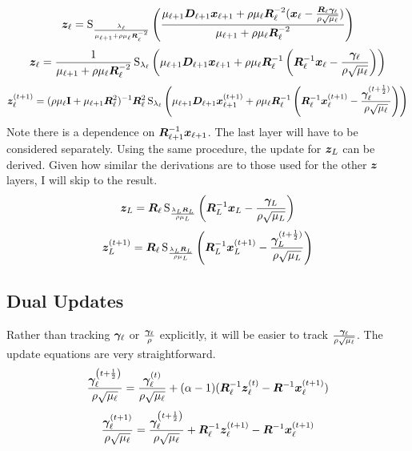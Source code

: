 %
\begin{equation}
\bm{z}_{\ell} = \operatorname{S}_{\frac{\lambda_{\ell}}{\mu_{\ell + 1} + \rho\mu_{\ell}\bm{R}_{\ell}^{-2}}}\left(\frac{\mu_{\ell + 1}\bm{D}_{\ell + 1}\bm{x}_{\ell + 1} + \rho\mu_{\ell}\bm{R}_{\ell}^{-2}(\bm{x}_{\ell} - \frac{\bm{R}_{\ell}\bm{\gamma}_{\ell}}{\rho\sqrt{\mu_{\ell}}})}{\mu_{\ell + 1} + \rho\mu_{\ell}\bm{R}_{\ell}^{-2}}\right)
\end{equation}
%
\begin{equation}
\bm{z}_{\ell} = \frac{1}{\mu_{\ell + 1} + \rho\mu_{\ell}\bm{R}_{\ell}^{-2}}\operatorname{S}_{\lambda_{\ell}}\left(\mu_{\ell + 1}\bm{D}_{\ell + 1}\bm{x}_{\ell + 1} + \rho\mu_{\ell}\bm{R}_{\ell}^{-1}\left(\bm{R}_{\ell}^{-1}\bm{x}_{\ell} - \frac{\bm{\gamma}_{\ell}}{\rho\sqrt{\mu_{\ell}}}\right)\right)
\end{equation}
%
\begin{equation}
\bm{z}_{\ell}^{(t + 1)} = (\rho\mu_{\ell}{\bf I} + \mu_{\ell + 1}\bm{R}_{\ell}^2)^{-1}\bm{R}_{\ell}^2\operatorname{S}_{\lambda_{\ell}}\left(\mu_{\ell + 1}\bm{D}_{\ell + 1}\bm{x}_{\ell + 1}^{(t + 1)} + \rho\mu_{\ell}\bm{R}_{\ell}^{-1}\left(\bm{R}_{\ell}^{-1}\bm{x}_{\ell}^{(t + 1)} - \frac{\bm{\gamma}_{\ell}^{(t + \frac{1}{2})}}{\rho\sqrt{\mu_{\ell}}}\right)\right)
\end{equation}
%
Note there is a dependence on $\bm{R}_{\ell + 1}^{-1}\bm{x}_{\ell + 1}$. The last layer will have to be considered separately. Using the same procedure, the update for $\bm{z}_L$ can be derived. Given how similar the derivations are to those used for the other $\bm{z}$ layers, I will skip to the result.
%
%
\begin{equation}
\bm{z}_L = \bm{R}_{\ell}\operatorname{S}_{\frac{\lambda_L\bm{R}_L}{\rho\mu_L}}\left(\bm{R}_L^{-1}\bm{x}_L - \frac{\bm{\gamma}_L}{\rho\sqrt{\mu_L}}\right)
\end{equation}
%
\begin{equation}
\bm{z}_L^{(t + 1)} = \bm{R}_{\ell}\operatorname{S}_{\frac{\lambda_L\bm{R}_L}{\rho\mu_L}}\left(\bm{R}_L^{-1}\bm{x}_L^{(t + 1)} - \frac{\bm{\gamma}_L^{(t + \frac{1}{2})}}{\rho\sqrt{\mu_L}}\right)
\end{equation}

\subsection{Dual Updates}
Rather than tracking $\bm{\gamma}_{\ell}$ or $\frac{\bm{\gamma}_{\ell}}{\rho}$ explicitly, it will be easier to track $\frac{\bm{\gamma}_{\ell}}{\rho\sqrt{\mu_{\ell}}}$. The update equations are very straightforward.
%
\begin{equation}
\frac{\bm{\gamma}_{\ell}^{\left(t + \frac{1}{2}\right)}}{\rho\sqrt{\mu_{\ell}}} = \frac{\bm{\gamma}_{\ell}^{(t)}}{\rho\sqrt{\mu_{\ell}}} + (\alpha - 1)(\bm{R}_{\ell}^{-1}\bm{z}_{\ell}^{(t)} - \bm{R}^{-1}\bm{x}_{\ell}^{(t + 1)})
\end{equation}
%
\begin{equation}
\frac{\bm{\gamma}_{\ell}^{(t + 1)}}{\rho\sqrt{\mu_{\ell}}} = \frac{\bm{\gamma}_{\ell}^{\left(t + \frac{1}{2}\right)}}{\rho\sqrt{\mu_{\ell}}} + \bm{R}_{\ell}^{-1}\bm{z}_{\ell}^{(t + 1)} - \bm{R}^{-1}\bm{x}_{\ell}^{(t + 1)} 
\end{equation}

